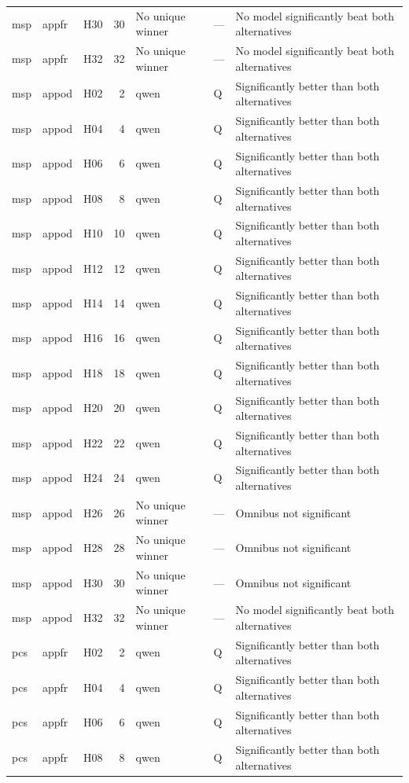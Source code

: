 \begin{longtable}{lllrlll}
msp & appfr & H30 & 30 & No unique winner & — & No model significantly beat both alternatives \\
msp & appfr & H32 & 32 & No unique winner & — & No model significantly beat both alternatives \\
msp & appod & H02 & 2 & qwen & Q & Significantly better than both alternatives \\
msp & appod & H04 & 4 & qwen & Q & Significantly better than both alternatives \\
msp & appod & H06 & 6 & qwen & Q & Significantly better than both alternatives \\
msp & appod & H08 & 8 & qwen & Q & Significantly better than both alternatives \\
msp & appod & H10 & 10 & qwen & Q & Significantly better than both alternatives \\
msp & appod & H12 & 12 & qwen & Q & Significantly better than both alternatives \\
msp & appod & H14 & 14 & qwen & Q & Significantly better than both alternatives \\
msp & appod & H16 & 16 & qwen & Q & Significantly better than both alternatives \\
msp & appod & H18 & 18 & qwen & Q & Significantly better than both alternatives \\
msp & appod & H20 & 20 & qwen & Q & Significantly better than both alternatives \\
msp & appod & H22 & 22 & qwen & Q & Significantly better than both alternatives \\
msp & appod & H24 & 24 & qwen & Q & Significantly better than both alternatives \\
msp & appod & H26 & 26 & No unique winner & — & Omnibus not significant \\
msp & appod & H28 & 28 & No unique winner & — & Omnibus not significant \\
msp & appod & H30 & 30 & No unique winner & — & Omnibus not significant \\
msp & appod & H32 & 32 & No unique winner & — & No model significantly beat both alternatives \\
pcs & appfr & H02 & 2 & qwen & Q & Significantly better than both alternatives \\
pcs & appfr & H04 & 4 & qwen & Q & Significantly better than both alternatives \\
pcs & appfr & H06 & 6 & qwen & Q & Significantly better than both alternatives \\
pcs & appfr & H08 & 8 & qwen & Q & Significantly better than both alternatives \\

\end{longtable}
